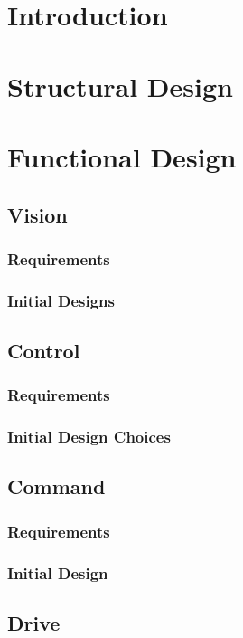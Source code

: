 \documentclass[a4paper]{article}
\begin{document}
\newpage

\section{Introduction}

\section{Structural Design}

\section{Functional Design}

\subsection{Vision}
\subsubsection{Requirements}
\subsubsection{Initial Designs}

\subsection{Control}
\subsubsection{Requirements}
\subsubsection{Initial Design Choices} 

\subsection{Command}
\subsubsection{Requirements}
\subsubsection{Initial Design}

\subsection{Drive}
\end{document}
